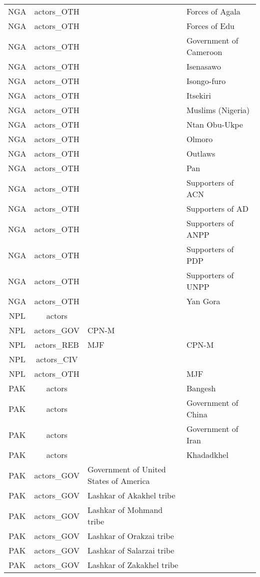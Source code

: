 \documentclass[12pt]{article}
\begin{document}
\begin{center}
\begin{longtable}{|c|c|p{7cm}|p{7cm}|}
  NGA & actors\_OTH &  & Forces of Agala \\ 
  NGA & actors\_OTH &  & Forces of Edu \\ 
  NGA & actors\_OTH &  & Government of Cameroon \\ 
  NGA & actors\_OTH &  & Isenasawo \\ 
  NGA & actors\_OTH &  & Isongo-furo \\ 
  NGA & actors\_OTH &  & Itsekiri \\ 
  NGA & actors\_OTH &  & Muslims (Nigeria) \\ 
  NGA & actors\_OTH &  & Ntan Obu-Ukpe \\ 
  NGA & actors\_OTH &  & Olmoro \\ 
  NGA & actors\_OTH &  & Outlaws \\ 
  NGA & actors\_OTH &  & Pan \\ 
  NGA & actors\_OTH &  & Supporters of ACN \\ 
  NGA & actors\_OTH &  & Supporters of AD \\ 
  NGA & actors\_OTH &  & Supporters of ANPP \\ 
  NGA & actors\_OTH &  & Supporters of PDP \\ 
  NGA & actors\_OTH &  & Supporters of UNPP \\ 
  NGA & actors\_OTH &  & Yan Gora \\ 
  NPL & actors &  &  \\ 
  NPL & actors\_GOV & CPN-M &  \\ 
  NPL & actors\_REB & MJF & CPN-M \\ 
  NPL & actors\_CIV &  &  \\ 
  NPL & actors\_OTH &  & MJF \\ 
  PAK & actors &  & Bangesh \\ 
  PAK & actors &  & Government of China \\ 
  PAK & actors &  & Government of Iran \\ 
  PAK & actors &  & Khadadkhel \\ 
  PAK & actors\_GOV & Government of United States of America &  \\ 
  PAK & actors\_GOV & Lashkar of Akakhel tribe &  \\ 
  PAK & actors\_GOV & Lashkar of Mohmand tribe &  \\ 
  PAK & actors\_GOV & Lashkar of Orakzai tribe &  \\ 
  PAK & actors\_GOV & Lashkar of Salarzai tribe &  \\ 
  PAK & actors\_GOV & Lashkar of Zakakhel tribe &  \\ 

\end{longtable}
\end{center}
\end{document}
